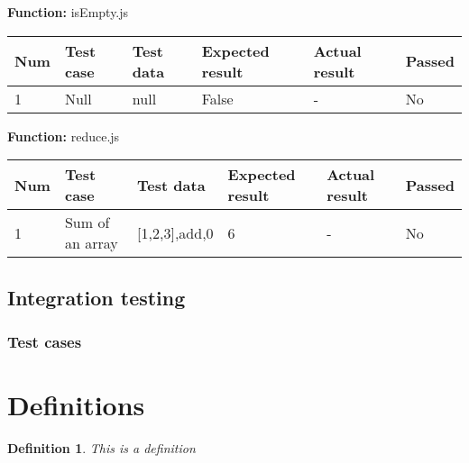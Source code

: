 \documentclass[a4paper, 12pt]{article}
\newtheorem{definition}{Definition}
\begin{document}
\newpage

        \textbf{Function:} isEmpty.js
        
        \begin{table}[h!]
           \begin{tabular}{|l|p{3cm}|p{2cm}|p{2cm}|p{2.5cm}|l|}
                \hline
                Num & Test case         						& Test data 					& Expected result 					& Actual result 		& Passed \\ \hline
                1   & Null 										& null     						& False                				& -             		& No     \\ \hline
            \end{tabular}
        \end{table}
    
        \textbf{Function:} reduce.js
        
        \begin{table}[h!]
           \begin{tabular}{|l|p{3cm}|p{2cm}|p{2cm}|p{2.5cm}|l|}
                \hline
                Num & Test case        					& Test data 					& Expected result 					& Actual result 		& Passed \\ \hline
                1   & Sum of an array 					& {[}1,2,3{]},add,0     		& 6                					& -             		& No     \\ \hline
            \end{tabular}
        \end{table}
    
    \newpage

    \subsection{Integration testing}

        \subsubsection{Test cases}

\section{Definitions}

\begin{definition}
    This is a definition
\end{definition}

\end{document}
